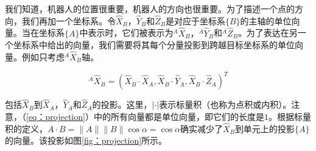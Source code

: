 我们知道，机器人的位置很重要，机器人的方向也很重要。为了描述一个点的方向，我们再加一个坐标系。令$\hat{X}_B$，$\hat{Y}_B$和$\hat{Z}_B$是对应于坐标系$\{B\}$的主轴的单位向量。当在坐标系$\{A\}$中表示时，它们被表示为$^A\hat{X}_B，^A\hat{Y}_B$和$^A\hat{Z}_B$。为了表达在另一个坐标系中给出的向量，我们需要将其每个分量投影到跨越目标坐标系的单位向量。例如只考虑$^A\hat{X}_B$轴。

\begin{equation}\label{eq:projection}
^A\hat{X}_B=(\hat{X}_B\cdot\hat{X}_A, \hat{X}_B\cdot\hat{Y}_A,\hat{X}_B\cdot\hat{Z}_A)^T
\end{equation}


包括$\hat{X}_B$到$\hat{X}_A$，$\hat{Y}_A$和$\hat{Z}_A$的投影。这里，$|\cdot|$表示标量积（也称为点积或内积）。注意，（\ref{eq：projection}）中的所有向量都是单位向量，即它们的长度是$1$。根据标量积的定义，$ A\cdot B =\|A\|\|B\|\cos \alpha=\cos\alpha$确实减少了$\hat{X}_B$到单元上的投影$\{A\}$的向量。该投影如图\ref{fig：projection}所示。

